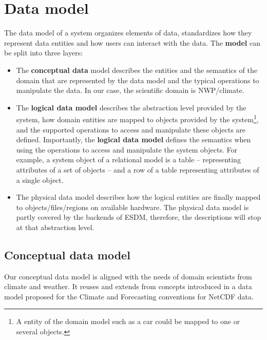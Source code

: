 \section{Data model}%
\label{data-model}

The data model of a system organizes elements of data, standardizes how they represent data entities and how users can interact with the data.
The \textbf{model} can be split into three layers:

\begin{itemize}
  \item The \textbf{conceptual data} model describes the entities and the semantics of the domain that are represented by the data model and the typical operations to manipulate the data. 
    In our case, the scientific domain is NWP/climate.
  \item The \textbf{logical data model} describes the abstraction level provided by the system, how domain entities are mapped to objects provided by the system\footnote{A entity of the domain model such as a car could be mapped to one or several objects.}, and the supported operations to access and manipulate these objects are defined.
    Importantly, the \textbf{logical data model} defines the semantics when using the operations to access and manipulate the system objects.
    For example, a system object of a relational model is a table -- representing attributes of a set of objects -- and a row of a table representing attributes of a single object.
  \item The physical data model describes how the logical entities are finally mapped to objects/files/regions on available hardware. 
    The physical data model is partly covered by the backends of ESDM, therefore, the descriptions will stop at that abstraction level.
\end{itemize}

\subsection{Conceptual data model}

Our conceptual data model is aligned with the needs of domain scientists from climate and weather. 
It reuses and extends from concepts introduced in a data model proposed for the Climate and Forecasting conventions for NetCDF data.

